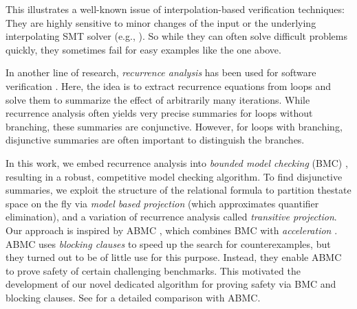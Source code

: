 This illustrates a well-known issue of interpolation-based verification techniques:
%
They are highly sensitive to minor changes of the input or the underlying interpolating SMT solver (e.g., \cite[p.~102]{gspacer}).
%
So while they can often solve difficult problems quickly, they sometimes fail for easy examples like the one above.

In another line of research, \emph{recurrence analysis} has been used for software verification \cite{kincaid15,kincaid17}.
%
Here, the idea is to extract recurrence equations from loops and solve them to summarize the effect of arbitrarily many iterations.
%
While recurrence analysis often yields very precise summaries for loops without branching, these summaries are conjunctive.
%
However, for loops with branching, disjunctive summaries are often important to distinguish the branches.

In this work, we embed recurrence analysis into \emph{bounded model checking}
(BMC) \cite{bmc2}, resulting in a robust, competitive model checking algorithm.
%
To find disjunctive summaries, we exploit the structure of the relational
formula to partition the\linebreak  state
space on the fly via \emph{model based projection} \cite{spacer} (which
approximates quanti\-fier elimination), and a variation of recurrence analysis
called \emph{transitive projection}.\linebreak
\indent
Our approach is inspired by ABMC \cite{abmc}, which combines BMC with \emph{acceleration} \cite{acceleration-calculus,octagonsP,bozga10}.
%
ABMC uses \emph{blocking clauses} to speed up the search for counterexamples, but they turned out to be of little use for this purpose.
%
Instead, they enable ABMC to prove safety of certain challenging benchmarks. This
moti\-vated the development of our novel dedicated algorithm for proving safety via
BMC and blocking clauses.
%
See  for a detailed comparison with ABMC.




